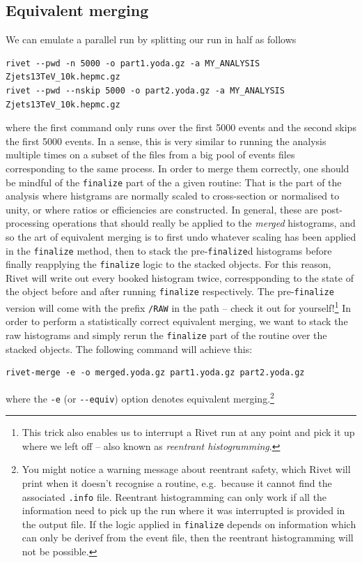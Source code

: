 \documentclass[10pt,fleqn]{scrartcl}
\theoremstyle{exstyle}
\begin{document}
\subsection{Equivalent merging}

We can emulate a parallel run by splitting our run in half as follows
\begin{verbatim}
rivet --pwd -n 5000 -o part1.yoda.gz -a MY_ANALYSIS Zjets13TeV_10k.hepmc.gz
rivet --pwd --nskip 5000 -o part2.yoda.gz -a MY_ANALYSIS Zjets13TeV_10k.hepmc.gz
\end{verbatim}
where the first command only runs over the first 5000 events and the second skips the first 5000 events.
In a sense, this is very similar to running the analysis multiple times on a subset of the files from a big
pool of events files corresponding to the same process. 
In order to merge them correctly, one should be mindful of the \verb|finalize| part of the a given routine:
That is the part of the analysis where histgrams are normally scaled to cross-section or normalised to unity, 
or where ratios or efficiencies are constructed. In general, these are post-processing operations that should 
really be applied to the \emph{merged} histograms, and so the art of equivalent merging is to first undo 
whatever scaling has been applied in the \verb|finalize| method, then to stack the 
pre-\verb|finalize|d histograms before finally reapplying the \verb|finalize| logic to the stacked objects.
For this reason, Rivet will write out every booked histogram twice, correspponding to the state of the object
before and after running \verb|finalize| respectively. The pre-\verb|finalize| version will come with the 
prefix \verb|/RAW| in the path -- check it out for yourself!\footnote{This trick also enables us to interrupt 
a Rivet run at any point and pick it up where we left off -- also known as \emph{reentrant histogramming}.}
In order to perform a statistically correct equivalent merging, we want to stack the raw histograms and simply
rerun the \verb|finalize| part of the routine over the stacked objects. The following command will achieve this:
\begin{verbatim}
rivet-merge -e -o merged.yoda.gz part1.yoda.gz part2.yoda.gz
\end{verbatim}
where the \verb|-e| (or \verb|--equiv|) option denotes equivalent merging.\footnote{You might notice a warning
message about reentrant safety, which Rivet will print when it doesn't recognise a routine, 
e.g.\ because it cannot find the associated \texttt{.info} file. 
Reentrant histogramming can only work if all the information need to pick up the run where it was
interrupted is provided in the output file. If the logic applied in \texttt{finalize} depends on information
which can only be derivef from the event file, then the reentrant histogramming will not be possible.}
\end{document}
